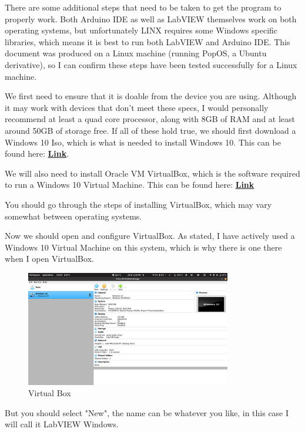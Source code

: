 \documentclass[a4paper,11pt]{report}
\let\oldhref\href %
\renewcommand{\href}[2]{\oldhref{#1}{\bfseries#2}}
\begin{document}
There are some additional steps that need to be taken to get the program to properly work. Both Arduino IDE as well as LabVIEW themselves work on both operating systems, but unfortunately LINX requires some Windows specific libraries, which means it is best to run both LabVIEW and Arduino IDE. This document was produced on a Linux machine (running PopOS, a Ubuntu derivative), so I can confirm these steps have been tested successfully for a Linux machine.

We first need to ensure that it is doable from the device you are using. Although it may work with devices that don't meet these specs, I would personally recommend at least a quad core processor, along with 8GB of RAM and at least around 50GB of storage free. If all of these hold true, we should first download a Windows 10 Iso, which is what is needed to install Windows 10. This can be found here: \href{https://www.microsoft.com/en-gb/software-download/windows10ISO}{Link}.

We will also need to install Oracle VM VirtualBox, which is the software required to run a Windows 10 Virtual Machine. This can be found here: \href{https://www.virtualbox.org/}{Link}

You should go through the steps of installing VirtualBox, which may vary somewhat between operating systems.

Now we should open and configure VirtualBox. As stated, I have actively used a Windows 10 Virtual Machine on this system, which is why there is one there when I open VirtualBox.

\begin{figure}[H]
\centering
\includegraphics[width=0.8\textwidth]{screenshots/virtualbox}
\caption{Virtual Box}
\end{figure}

But you should select "New", the name can be whatever you like, in this case I will call it LabVIEW Windows.
\end{document}
